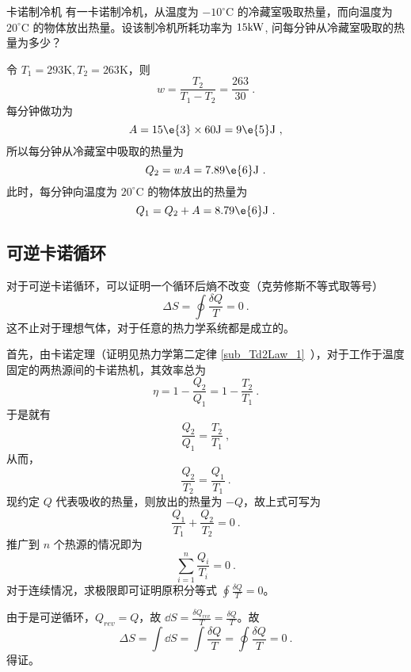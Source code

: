 \begin{example}{卡诺制冷机}
有一卡诺制冷机，从温度为 $-10^{\circ} \mathrm{C}$ 的冷藏室吸取热量，而向温度为 $20^{\circ} \mathrm{C}$ 的物体放出热量。设该制冷机所耗功率为 $15\rm kW$, 问每分钟从冷藏室吸取的热量为多少？

令 $T_1 = 293 \mathrm K , T_2 = 263 \mathrm K $，则
\begin{equation}
w=\frac{T_{2}}{T_{1}-T_{2}}=\frac{263}{30}~.
\end{equation}
每分钟做功为
\begin{equation}
A=15\e{3} \times 60 \mathrm{J}=9\e{5} \mathrm{J}~,
\end{equation}
所以每分钟从冷藏室中吸取的热量为
\begin{equation}
Q_{2}=w A=7.89\e{6} \mathrm{J}~.
\end{equation}
此时，每分钟向温度为 $20^{\circ} \mathrm{C}$ 的物体放出的热量为
\begin{equation}
Q_{1}=Q_{2}+A=8.79\e{6} \mathrm{J}~.
\end{equation}

\end{example}
\subsection{可逆卡诺循环}
对于可逆卡诺循环，可以证明一个循环后熵不改变（克劳修斯不等式取等号）
\begin{equation}
\Delta S = \oint \frac{\delta Q}{T}=0~.
\end{equation} %
这不止对于理想气体，对于任意的热力学系统都是成立的。

首先，由卡诺定理（证明见热力学第二定律 \autoref{sub_Td2Law_1}~），对于工作于温度固定的两热源间的卡诺热机，其效率总为
$$\eta = 1- \frac{Q_2}{Q_1} = 1-\frac{T_2}{T_1}~.$$
于是就有
$$\frac{Q_2}{Q_1} = \frac{T_2}{T_1} ~,$$
从而，
$$\frac{Q_2}{T_2} = \frac{Q_1}{T_1} ~.$$
现约定 $Q$ 代表吸收的热量，则放出的热量为 $-Q$，故上式可写为
\begin{equation}
\frac{Q_1}{T_1} + \frac{Q_2}{T_2} = 0~.
\end{equation}
推广到 $n$ 个热源的情况即为
\begin{equation}
\sum_{i=1}^{n} \frac{Q_i}{T_i} = 0 ~.
\end{equation}
对于连续情况，求极限即可证明原积分等式 $\oint \frac{\delta Q}{T} = 0$。

由于是可逆循环，$Q_{rev} = Q$，故 $\dd S = \frac{\delta Q_{rev}}{T} = \frac{\delta Q}{T}$。故
\begin{equation}
\Delta S = \int \dd S = \int {\frac{\delta Q}{T}} = \oint {\frac {\delta Q}{T}} = 0~.
\end{equation}
得证。
